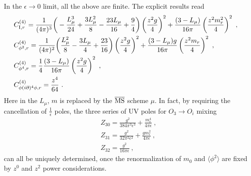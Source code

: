 \documentclass[a4paper,11pt]{article}
\begin{document}
In the $\epsilon \rightarrow 0$ limit, all the above are finite. The explicit results read
\begin{align}
&C_{{\rm I},r}^{(4)}=\frac{1}{(4\pi)^3}\bigg(-\frac{L_\mu^3}{24}+\frac{3 L_\mu^2}{8}-\frac{23L_\mu}{16}+\frac{9}{4}\bigg)\left(\frac{z^2g}{4}\right)^2+\frac{(3-L_\mu)}{16 \pi }\left(\frac{z^2m_r^2}{4}\right)^2 \ , \\ 
&C_{\phi^2,r}^{(4)}=\frac{1}{(4\pi)^2}\bigg(\frac{ L_\mu^2}{8}-\frac{3L_\mu}{4}+\frac{23}{16}\bigg)\left(\frac{z^2g}{4}\right)^2+\frac{ (3-L_\mu) g}{16 \pi }\left(\frac{z^2m_r}{4}\right)^2 \ , \\
&C_{\phi^4,r}^{(4)}=\frac{1}{4}\frac{(3-L_\mu)}{16 \pi }\left(\frac{z^2g}{4}\right)^2 \ , \\
&C_{\phi(i\partial)^4\phi,r}^{(4)}=\frac{z^4}{64} \ .
\end{align}
Here in the $L_{\mu}$, $m$ is replaced by the $\overline{\rm MS}$ scheme $\mu$. In fact, by requiring the cancellation of $\frac{1}{\epsilon}$ poles, the three series of UV poles for $O_3\rightarrow O_i$ mixing 
\begin{align}
& Z_{30}=\frac{g^2}{384 \pi ^3 \epsilon^3}+\frac{ m_r^4}{4 \pi  \epsilon} \ , \\
& Z_{31}=\frac{g^2}{32 \pi ^2 \epsilon^2}+\frac{g m_r^2}{4 \pi  \epsilon} \ ,  \\ 
& Z_{32}=\frac{g^2}{16\pi \epsilon} \ ,
\end{align}
can all be uniquely determined,  once the renormalization of $m_0$ and $\langle \phi^2 \rangle$ are fixed by $z^0$ and $z^2$ power considerations. 
\end{document}

